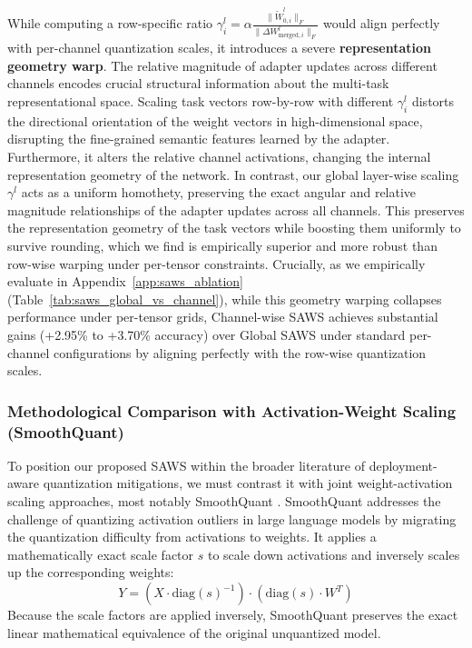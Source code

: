 While computing a row-specific ratio $\gamma^l_i = \alpha \frac{\|\tilde{W}^l_{0, i}\|_F}{\|\Delta W^l_{\text{merged}, i}\|_F}$ would align perfectly with per-channel quantization scales, it introduces a severe \textbf{representation geometry warp}. The relative magnitude of adapter updates across different channels encodes crucial structural information about the multi-task representational space. Scaling task vectors row-by-row with different $\gamma^l_i$ distorts the directional orientation of the weight vectors in high-dimensional space, disrupting the fine-grained semantic features learned by the adapter. Furthermore, it alters the relative channel activations, changing the internal representation geometry of the network. In contrast, our global layer-wise scaling $\gamma^l$ acts as a uniform homothety, preserving the exact angular and relative magnitude relationships of the adapter updates across all channels. This preserves the representation geometry of the task vectors while boosting them uniformly to survive rounding, which we find is empirically superior and more robust than row-wise warping under per-tensor constraints. Crucially, as we empirically evaluate in Appendix~\ref{app:saws_ablation} (Table~\ref{tab:saws_global_vs_channel}), while this geometry warping collapses performance under per-tensor grids, Channel-wise SAWS achieves substantial gains (+2.95\% to +3.70\% accuracy) over Global SAWS under standard per-channel configurations by aligning perfectly with the row-wise quantization scales.

\subsubsection{Methodological Comparison with Activation-Weight Scaling (SmoothQuant)}
To position our proposed SAWS within the broader literature of deployment-aware quantization mitigations, we must contrast it with joint weight-activation scaling approaches, most notably SmoothQuant \cite{xiao2023smoothquant}. SmoothQuant addresses the challenge of quantizing activation outliers in large language models by migrating the quantization difficulty from activations to weights. It applies a mathematically exact scale factor $s$ to scale down activations and inversely scales up the corresponding weights:
\begin{equation}
  Y = \left( X \cdot \text{diag}(s)^{-1} \right) \cdot \left( \text{diag}(s) \cdot W^T \right)
\end{equation}
Because the scale factors are applied inversely, SmoothQuant preserves the exact linear mathematical equivalence of the original unquantized model. 

